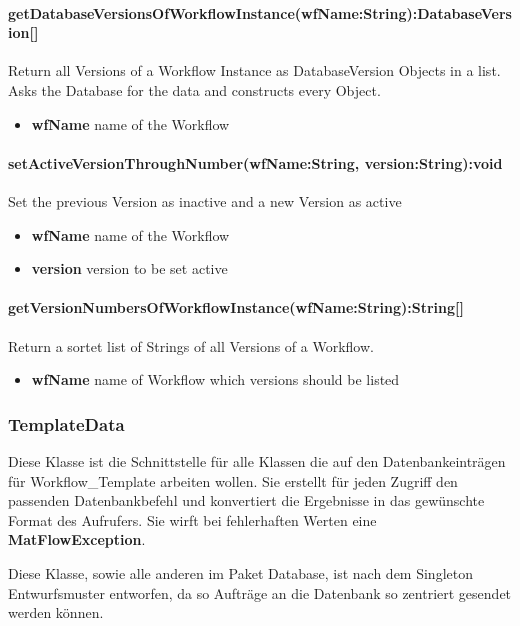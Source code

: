 \paragraph{getDatabaseVersionsOfWorkflowInstance(wfName:String):DatabaseVersion[]}
 Return all Versions of a Workflow Instance as DatabaseVersion Objects in a list.
 Asks the Database for the data and constructs every Object.
\begin{itemize}
	\item \textbf{wfName}
	name of the Workflow
\end{itemize}

\paragraph{setActiveVersionThroughNumber(wfName:String, version:String):void}
Set the previous Version as inactive and a new Version as active
\begin{itemize}
	\item \textbf{wfName}
	name of the Workflow
	\item \textbf{version}
	version to be set active
\end{itemize}

\paragraph{getVersionNumbersOfWorkflowInstance(wfName:String):String[]}
Return a sortet list of Strings of all Versions of a Workflow.
\begin{itemize}
	\item \textbf{wfName}
	name of Workflow which versions should be listed
\end{itemize}



\subsubsection{TemplateData}
Diese Klasse ist die Schnittstelle für alle Klassen die auf den Datenbankeinträgen für Workflow\_Template arbeiten wollen. Sie erstellt für jeden Zugriff den passenden Datenbankbefehl und konvertiert die Ergebnisse in das gewünschte Format des Aufrufers.
Sie wirft bei fehlerhaften Werten eine \textbf{MatFlowException}.

Diese Klasse, sowie alle anderen im Paket Database, ist nach dem Singleton Entwurfsmuster entworfen, da so Aufträge an die Datenbank so zentriert gesendet werden können.

